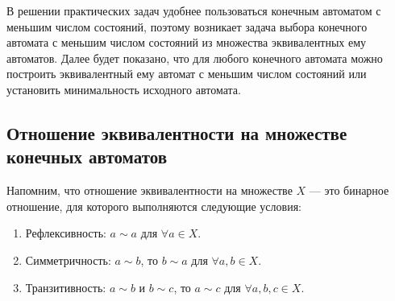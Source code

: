 В решении практических задач удобнее пользоваться конечным автоматом с меньшим числом состояний, поэтому возникает задача выбора конечного автомата с меньшим числом состояний из множества эквивалентных ему автоматов. Далее будет показано, что для любого конечного автомата можно построить эквивалентный ему автомат с меньшим числом состояний или установить минимальность исходного автомата.

\subsection*{Отношение эквивалентности на множестве конечных автоматов}
Напомним, что отношение эквивалентности на множестве $X$ --- это бинарное отношение, для которого выполняются следующие условия:
\begin{enumerate}
\item Рефлексивность: $a \sim a$ для $\forall a \in X$.
\item Симметричность: $a \sim b$, то $b \sim a$ для $\forall a, b \in X$.
\item Транзитивность: $a \sim b$ и $b \sim c$, то $a \sim c$ для $\forall a, b, c \in X$.
\end{enumerate}

